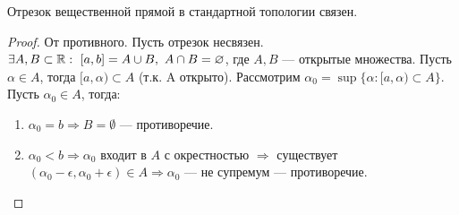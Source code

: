 \begin{statement}
    Отрезок вещественной прямой в стандартной топологии связен.
\end{statement}
\begin{proof}
    От противного. Пусть отрезок несвязен. $\exists A, B \subset \mathbb{R}: \ [a, b] = A \cup B, \ A \cap B = \varnothing$, где $A, B$ — открытые множества. Пусть $\alpha \in A$, тогда $[a, \alpha) \subset A$ (т.к. A открыто). Рассмотрим $\alpha_0 = \sup\{ {\alpha}: [a, \alpha) \subset A\}$. \\
    Пусть $\alpha_0 \in A$, тогда:
    \begin{enumerate}
        \item $\alpha_0 = b \Longrightarrow B = \emptyset$ — противоречие.
        \item $\alpha_0 < b \Longrightarrow \alpha_0$ входит в $A$ с окрестностью $\Longrightarrow$ существует $(\alpha_0 - \epsilon, \alpha_0 + \epsilon) \in A \Longrightarrow \alpha_0$ — не супремум — противоречие.
    \end{enumerate}
\end{proof}

